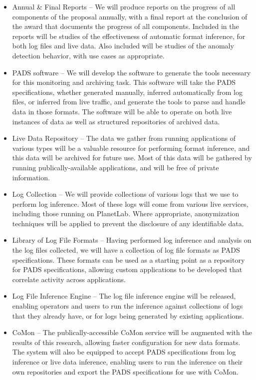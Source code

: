 \documentclass[12pt]{article}
\begin{document}
\begin{itemize}
\item Annual \& Final Reports -- We will produce reports on the
progress of all components of the proposal annually, with a final
report at the conclusion of the award that documents the progress of
all components. Included in the reports will be studies of the
effectiveness of automatic format inference, for both log files and
live data. Also included will be studies of the anomaly detection
behavior, with use cases as appropriate.

\item PADS software -- We will develop the software to generate the
tools necessary for this monitoring and archiving task. This software
will take the PADS specifications, whether generated manually,
inferred automatically from log files, or inferred from live traffic,
and generate the tools to parse and handle data in those formats. The
software will be able to operate on both live instances of data as
well as structured repositories of archived data.

\item Live Data Repository -- The data we gather from running
applications of various types will be a valuable resource for
performing format inference, and this data will be archived for future
use. Most of this data will be gathered by running
publically-available applications, and will be free of private
information.

\item Log Collection -- We will provide collections of various logs
that we use to perform log inference. Most of these logs will come
from various live services, including those running on PlanetLab.
Where appropriate, anonymization techniques will be applied to
prevent the disclosure of any identifiable data.

\item Library of Log File Formats -- Having performed log inference
and analysis on the log files collected, we will have a collection of
log file formats as PADS specifications. These formats can be used as
a starting point as a repository for PADS specifications, allowing
custom applications to be developed that correlate activity across
applications.

\item Log File Inference Engine -- The log file inference engine will
be released, enabling operators and users to run the inference against
collections of logs that they already have, or for logs being
generated by existing applications.

\item CoMon -- The publically-accessible CoMon service will be
augmented with the results of this research, allowing faster
configuration for new data formats. The system will also be equipped
to accept PADS specifications from log inference or live data
inference, enabling users to run the inference on their own
repositories and export the PADS specifications for use with CoMon.

\end{itemize}
\end{document}
